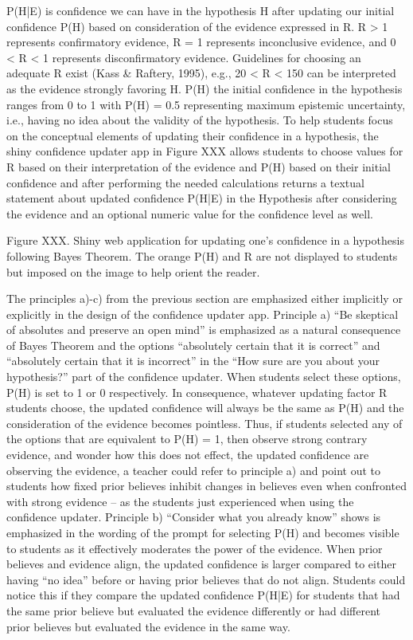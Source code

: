 P(H|E) is confidence we can have in the hypothesis H after updating our initial confidence P(H) based on consideration of the evidence expressed in R. R > 1 represents confirmatory evidence, R = 1 represents inconclusive evidence, and 0 < R < 1 represents disconfirmatory evidence. Guidelines for choosing an adequate R exist (Kass & Raftery, 1995), e.g., 20 < R < 150 can be interpreted as the evidence strongly favoring H. P(H) the initial confidence in the hypothesis ranges from 0 to 1 with P(H) = 0.5 representing maximum epistemic uncertainty, i.e., having no idea about the validity of the hypothesis. To help students focus on the conceptual elements of updating their confidence in a hypothesis, the shiny confidence updater app in Figure XXX allows students to choose values for R based on their interpretation of the evidence and P(H) based on their initial confidence and after performing the needed calculations returns a textual statement about updated confidence P(H|E) in the Hypothesis after considering the evidence and an optional numeric value for the confidence level as well. 
 
Figure XXX. Shiny web application for updating one’s confidence in a hypothesis following Bayes Theorem. The orange P(H) and R are not displayed to students but imposed on the image to help orient the reader.

The principles a)-c) from the previous section are emphasized either implicitly or explicitly in the design of the confidence updater app. 
Principle a) “Be skeptical of absolutes and preserve an open mind” is emphasized as a natural consequence of Bayes Theorem and the options “absolutely certain that it is correct” and “absolutely certain that it is incorrect” in the “How sure are you about your hypothesis?” part of the confidence updater. When students select these options, P(H) is set to 1 or 0 respectively. In consequence, whatever updating factor R students choose, the updated confidence will always be the same as P(H) and the consideration of the evidence becomes pointless. Thus, if students selected any of the options that are equivalent to P(H) = 1, then observe strong contrary evidence, and wonder how this does not effect, the updated confidence are observing the evidence, a teacher could refer to principle a) and point out to students how fixed prior believes inhibit changes in believes even when confronted with strong evidence – as the students just experienced when using the confidence updater.
Principle b) “Consider what you already know” shows is emphasized in the wording of the prompt for selecting P(H) and becomes visible to students as it effectively moderates the power of the evidence. When prior believes and evidence align, the updated confidence is larger compared to either having “no idea” before or having prior believes that do not align. Students could notice this if they compare the updated confidence P(H|E) for students that had the same prior believe but evaluated the evidence differently or had different prior believes but evaluated the evidence in the same way. 

